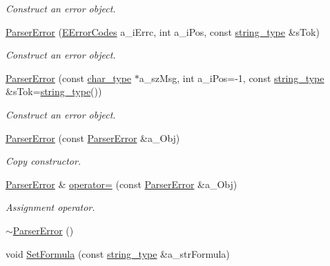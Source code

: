 \begin{DoxyCompactItemize}
\begin{DoxyCompactList}\small\item\em Construct an error object. \end{DoxyCompactList}\item 
\hyperlink{classmu_1_1_parser_error_ab21ddceddd5ae816abc1060873a245b0}{Parser\+Error} (\hyperlink{namespacemu_acf304a3ef5c4625d0eac5953aa1b688a}{E\+Error\+Codes} a\+\_\+i\+Errc, int a\+\_\+i\+Pos, const \hyperlink{namespacemu_ae9f8b44d9a97dd397180891e8390c3e9}{string\+\_\+type} \&s\+Tok)
\begin{DoxyCompactList}\small\item\em Construct an error object. \end{DoxyCompactList}\item 
\hyperlink{classmu_1_1_parser_error_ac4f83d23ad5875683d4100a85f0fbdfc}{Parser\+Error} (const \hyperlink{namespacemu_a81cc89a81a8872430ab1799b5848c5ca}{char\+\_\+type} $\ast$a\+\_\+sz\+Msg, int a\+\_\+i\+Pos=-\/1, const \hyperlink{namespacemu_ae9f8b44d9a97dd397180891e8390c3e9}{string\+\_\+type} \&s\+Tok=\hyperlink{namespacemu_ae9f8b44d9a97dd397180891e8390c3e9}{string\+\_\+type}())
\begin{DoxyCompactList}\small\item\em Construct an error object. \end{DoxyCompactList}\item 
\hyperlink{classmu_1_1_parser_error_a0820d687ae9ed8eed5bad962b40d006c}{Parser\+Error} (const \hyperlink{classmu_1_1_parser_error}{Parser\+Error} \&a\+\_\+\+Obj)
\begin{DoxyCompactList}\small\item\em Copy constructor. \end{DoxyCompactList}\item 
\hyperlink{classmu_1_1_parser_error}{Parser\+Error} \& \hyperlink{classmu_1_1_parser_error_ae2c28377fa08e425a5f3df2cfa221b33}{operator=} (const \hyperlink{classmu_1_1_parser_error}{Parser\+Error} \&a\+\_\+\+Obj)
\begin{DoxyCompactList}\small\item\em Assignment operator. \end{DoxyCompactList}\item 
\hyperlink{classmu_1_1_parser_error_aee52babeeffcf663365b551c3ea61e1f}{$\sim$\+Parser\+Error} ()
\item 
void \hyperlink{classmu_1_1_parser_error_a1b7b4b511525f13f728c9c2942983b19}{Set\+Formula} (const \hyperlink{namespacemu_ae9f8b44d9a97dd397180891e8390c3e9}{string\+\_\+type} \&a\+\_\+str\+Formula)

\end{DoxyCompactItemize}

